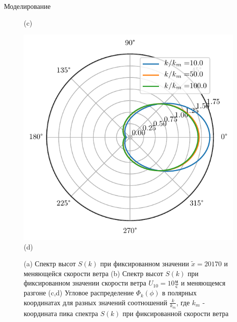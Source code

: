 \begin{frame}[t]{}
\begin{columns}[t]
\begin{column}{.48\linewidth}
\begin{block}{Моделирование}
\begin{figure}[h]
\begin{minipage}{0.24\linewidth}
                \centering
                (c)
            \end{minipage}
            \begin{minipage}{0.24\linewidth}
                \includegraphics[width=\linewidth]{fig/full_angles2}
                \centering
                (d)
            \end{minipage}
            \label{fig:spec}
            \caption{(a) Спектр высот $S(k)$ при фиксированном значении  $\tilde x = 20170$ и меняющейся скорости ветра 
            (b) Спектр высот $S(k)$ при фиксированном значении скорости ветра $U_{10} = 10 \frac{\text{м}}{\text{с}}$ и меняющемся разгоне 
        (c,d) Угловое распределение  $\Phi_k(\phi)$ в полярных координатах для разных значений соотношений  $\frac{k}{k_m}$, где $k_m$ - координата пика спектра $S(k)$ при фиксированной скорости ветра}
        \end{figure}
        \begin{figure}[h]
            \begin{minipage}{0.45\linewidth}

\end{minipage}
\end{figure}
\end{block}
\end{column}
\end{columns}
\end{frame}
